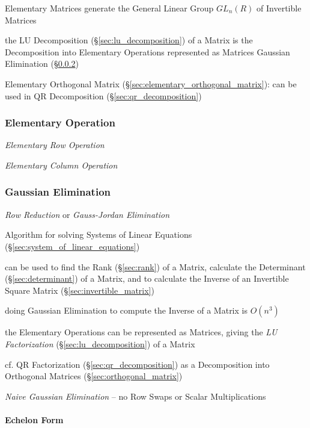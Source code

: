 Elementary Matrices generate the General Linear Group $GL_n(R)$ of Invertible
Matrices

the LU Decomposition (\S\ref{sec:lu_decomposition}) of a Matrix is the
Decomposition into Elementary Operations represented as Matrices \fist Gaussian
Elimination (\S\ref{sec:gaussian_elimination})

Elementary Orthogonal Matrix (\S\ref{sec:elementary_orthogonal_matrix}): can be
used in QR Decomposition (\S\ref{sec:qr_decomposition})



\subsubsection{Elementary Operation}\label{sec:elementary_operation}

\emph{Elementary Row Operation}

\emph{Elementary Column Operation}



\subsubsection{Gaussian Elimination}\label{sec:gaussian_elimination}

\emph{Row Reduction} or \emph{Gauss-Jordan Elimination}

Algorithm for solving Systems of Linear Equations
(\S\ref{sec:system_of_linear_equations})

can be used to find the Rank (\S\ref{sec:rank}) of a Matrix, calculate the
Determinant (\S\ref{sec:determinant}) of a Matrix, and to calculate the Inverse
of an Invertible Square Matrix (\S\ref{sec:invertible_matrix})

doing Gaussian Elimination to compute the Inverse of a Matrix is $O(n^3)$

the Elementary Operations can be represented as Matrices, giving the \emph{LU
  Factorization} (\S\ref{sec:lu_decomposition}) of a Matrix

cf. QR Factorization (\S\ref{sec:qr_decomposition}) as a Decomposition into
Orthogonal Matrices (\S\ref{sec:orthogonal_matrix})

\emph{Naive Gaussian Elimination} -- no Row Swaps or Scalar Multiplications



\paragraph{Echelon Form}\label{sec:echelon_form}\hfill

